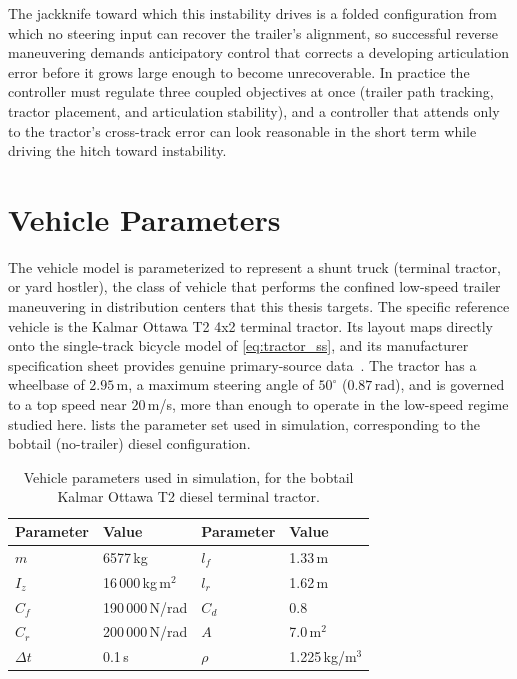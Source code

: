 

The jackknife toward which this instability drives is a folded configuration from which no steering input can recover the trailer's alignment, so successful reverse maneuvering demands anticipatory control that corrects a developing articulation error before it grows large enough to become unrecoverable. In practice the controller must regulate three coupled objectives at once (trailer path tracking, tractor placement, and articulation stability), and a controller that attends only to the tractor's cross-track error can look reasonable in the short term while driving the hitch toward instability.

\section{Vehicle Parameters}
\label{sec:vehicle_params}

The vehicle model is parameterized to represent a shunt truck (terminal tractor, or yard hostler), the class of vehicle that performs the confined low-speed trailer maneuvering in distribution centers that this thesis targets. The specific reference vehicle is the Kalmar Ottawa T2 4x2 terminal tractor. Its layout maps directly onto the single-track bicycle model of \cref{eq:tractor_ss}, and its manufacturer specification sheet provides genuine primary-source data~\cite{kalmar2022ottawa}. The tractor has a wheelbase of $2.95$\,m, a maximum steering angle of $50^\circ$ ($0.87$\,rad), and is governed to a top speed near $20$\,m/s, more than enough to operate in the low-speed regime studied here.  lists the parameter set used in simulation, corresponding to the bobtail (no-trailer) diesel configuration.

\begin{table}[H]
\centering
\caption{Vehicle parameters used in simulation, for the bobtail Kalmar Ottawa T2 diesel terminal tractor.}
\label{tab:vehicle_params}
\begin{tabular}{llll}
\toprule
Parameter & Value & Parameter & Value \\
\midrule
$m$ & 6577\,kg & $l_f$ & 1.33\,m \\
$I_z$ & 16\,000\,kg\,m$^2$ & $l_r$ & 1.62\,m \\
$C_f$ & 190\,000\,N/rad & $C_d$ & 0.8 \\
$C_r$ & 200\,000\,N/rad & $A$ & 7.0\,m$^2$ \\
$\Delta t$ & 0.1\,s & $\rho$ & 1.225\,kg/m$^3$ \\
\bottomrule
\end{tabular}
\end{table}

